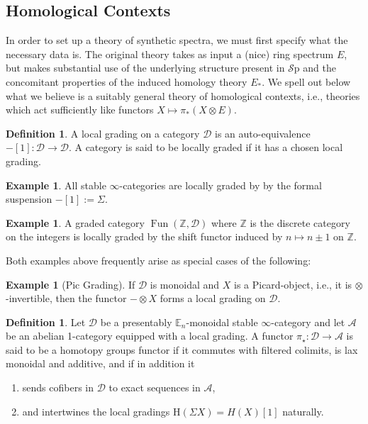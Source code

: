 \documentclass[10pt]{amsart}
\theoremstyle{definition}
\numberwithin{figure}{section}
\numberwithin{equation}{section}
\newtheorem{definition}[figure]{Definition}
\newtheorem{example}[figure]{Example}
\newcommand{\cA}{\mathcal{A}}
\newcommand{\cD}{\mathcal{D}}
\theoremstyle{cited}
\newcommand{\bZ}{\mathbb{Z}}
\newcommand{\bE}{\mathbb{E}}
\newcommand{\Fun}{\operatorname{Fun}}
\newcommand{\Sp}{{\mathcal{S}\mathrm{p}}}
\renewcommand{\H}{\mathrm{H}}
\begin{document}
\subsection{Homological Contexts} In order to set up a theory of synthetic spectra, we must first specify what the necessary data is. The original theory takes as input a (nice) ring spectrum $E$, but makes substantial use of the underlying structure present in $\Sp$ and the concomitant properties of the induced homology theory $E_*$. We spell out below what we believe is a suitably general theory of homological contexts, i.e., theories which act sufficiently like functors $X\mapsto \pi_*(X\otimes E)$.


\begin{definition}
  A local grading on a category $\cD$ is an auto-equivalence $-[1]:\cD\to \cD$. A category is said to be locally graded if it has a chosen local grading.
\end{definition}

\begin{example}
  All stable $\infty$-categories are locally graded by by the formal suspension $-[1]:=\Sigma$. 
\end{example}

\begin{example}
  A graded category $\Fun(\bZ,\cD)$ where $\bZ$ is the discrete category on the integers is locally graded by the shift functor induced by $n\mapsto n\pm 1$ on $\bZ$.
\end{example}

Both examples above frequently arise as special cases of the following:

\begin{example}[Pic Grading]
  If $\cD$ is monoidal and $X$ is a Picard-object, i.e., it is $\otimes$-invertible, then the functor $-\otimes X$ forms a local grading on $\cD$.
\end{example}

\begin{definition}
  Let $\cD$ be a presentably $\bE_n$-monoidal stable $\infty$-category and let $\cA$ be an abelian 1-category equipped with a local grading. A functor $\pi_\star:\cD\to \cA$ is said to be a homotopy groups functor if it commutes with filtered colimits, is lax monoidal and additive, and if in addition it
  \begin{enumerate}
    \item sends cofibers in $\cD$ to exact sequences in $\cA$,
    \item and intertwines the local gradings $\H(\Sigma X)=H(X)[1]$ naturally.
  \end{enumerate}
\end{definition}
\end{document}
